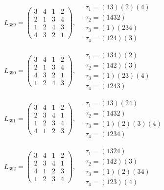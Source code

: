 $L_{389} = \begin{pmatrix} 3 & 4 & 1 & 2 \\ 2 & 1 & 3 & 4 \\ 1 & 2 & 4 & 3 \\ 4 & 3 & 2 & 1 \end{pmatrix}, \quad \begin{matrix} \tau_{1} = (1 3)(2)(4) \\ \tau_{2} = (1 4 3 2) \\ \tau_{3} = (1)(2 3 4) \\ \tau_{4} = (1 2 4)(3) \end{matrix}$

$L_{390} = \begin{pmatrix} 3 & 4 & 1 & 2 \\ 2 & 1 & 3 & 4 \\ 4 & 3 & 2 & 1 \\ 1 & 2 & 4 & 3 \end{pmatrix}, \quad \begin{matrix} \tau_{1} = (1 3 4)(2) \\ \tau_{2} = (1 4 2)(3) \\ \tau_{3} = (1)(2 3)(4) \\ \tau_{4} = (1 2 4 3) \end{matrix}$

$L_{391} = \begin{pmatrix} 3 & 4 & 1 & 2 \\ 2 & 3 & 4 & 1 \\ 1 & 2 & 3 & 4 \\ 4 & 1 & 2 & 3 \end{pmatrix}, \quad \begin{matrix} \tau_{1} = (1 3)(2 4) \\ \tau_{2} = (1 4 3 2) \\ \tau_{3} = (1)(2)(3)(4) \\ \tau_{4} = (1 2 3 4) \end{matrix}$

$L_{392} = \begin{pmatrix} 3 & 4 & 1 & 2 \\ 2 & 3 & 4 & 1 \\ 4 & 1 & 2 & 3 \\ 1 & 2 & 3 & 4 \end{pmatrix}, \quad \begin{matrix} \tau_{1} = (1 3 2 4) \\ \tau_{2} = (1 4 2)(3) \\ \tau_{3} = (1)(2)(3 4) \\ \tau_{4} = (1 2 3)(4) \end{matrix}$

